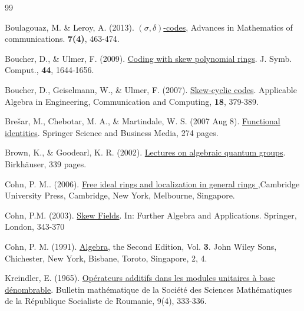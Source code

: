 \documentclass[12pt,a4paper]{article}
\newcommand{\si}{\sigma}
\begin{document}
	\begin{thebibliography}{99}
		
	 Boulagouaz, M. \&  Leroy, A. (2013).  {\href{https://arxiv.org/pdf/1304.6518}{$(\si, \delta)$-codes}}, Advances in Mathematics of communications. \textbf{7(4)}, 463-474.
		
		
	 Boucher, D., \& Ulmer, F. (2009). {\href{https://www.sciencedirect.com/science/article/pii/S0747717108001788/pdf?md5=bdc7211ad3a98feb931794a2bd47adbe&pid=1-s2.0-S0747717108001788-main.pdf&_valck=1}{Coding with skew polynomial rings}}. J. Symb. Comput., {\bf 44}, 1644-1656.
		
	 Boucher, D., Geiselmann, W., \& Ulmer, F. (2007). {\href{https://link.springer.com/article/10.1007/s00200-007-0043-z#citeas}{Skew-cyclic codes}}. Applicable Algebra in Engineering, Communication and Computing, {\bf 18}, 379-389.
	
	 Brešar, M., Chebotar, M. A., \& Martindale, W. S. (2007 Aug 8). {\href{https://doi.org/10.1007/978-3-7643-7796-0}{Functional identities}}. Springer Science and Business Media, 274 pages.
			
	 Brown, K., \& Goodearl, K. R. (2002). {\href{https://doi.org/10.1007/978-3-0348-8205-7}{Lectures on algebraic quantum groups}}. Birkhäuser, 339 pages.
	
	 Cohn, P. M.. (2006). {\href{https://doi.org/10.1017/CBO9780511542794}{Free ideal rings and localization in general rings }},Cambridge University Press, Cambridge, New York, Melbourne,  Singapore.
	
	 Cohn, P.M. (2003). {\href{https://doi.org/10.1007/978-1-4471-0039-3_9}{Skew Fields}}. In: Further Algebra and Applications. Springer, London,  343-370 
 
	 Cohn, P. M. (1991). {\href{https://doi.org/10.2307/3618415}{Algebra}}, the Second Edition, Vol. {\bf 3}. John Wiley Sons, Chichester, New York, Bisbane, Toroto, Singapore, 2, 4.
	
	 Kreindler, E. (1965). {\href{https://www.jstor.org/stable/43679461}{ Op\'erateurs additifs dans les modules unitaires à base dénombrable}}. Bulletin mathématique de la Société des Sciences Mathématiques de la République Socialiste de Roumanie, 9(4), 333-336.
		

\end{thebibliography}
\end{document}
